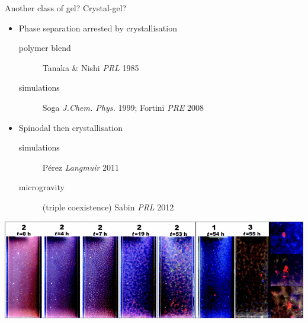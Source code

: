 \documentclass[xcolor=table]{beamer}
\begin{document}
\begin{frame}{Another class of gel? Crystal-gel?}
	\begin{itemize}
	\item Phase separation arrested by crystallisation
	\begin{description}
		\item[polymer blend] Tanaka \& Nishi \textit{PRL} 1985
		\item[simulations] Soga \textit{J.Chem. Phys.} 1999; Fortini \textit{PRE} 2008 
	\end{description}
	\item Spinodal then crystallisation
	\begin{description}
		\item[simulations] Pérez \textit{Langmuir} 2011
		\item[microgravity] (triple coexistence) Sabin \textit{PRL} 2012
	\end{description}
	\end{itemize}
	\includegraphics[width=\textwidth]{presentation/micrograv_Sabin2012}
\end{frame}
\end{document}
